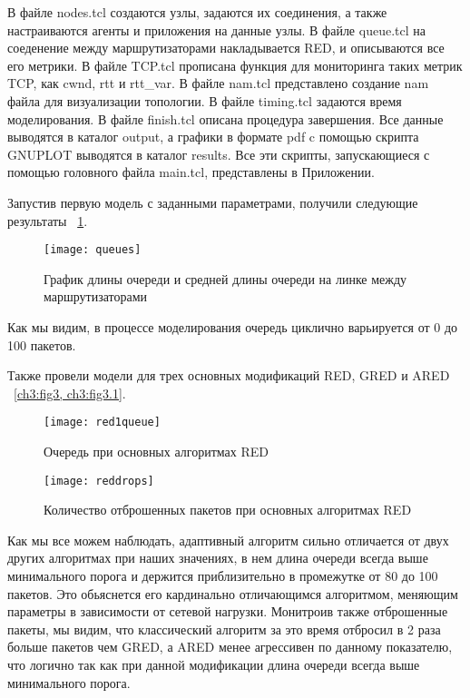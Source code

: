 В файле nodes.tcl создаются узлы, задаются их соединения, а также настраиваются агенты и приложения на данные узлы. 
В файле queue.tcl на соеденение между маршрутизаторами накладывается RED, и описываются все его метрики. В файле TCP.tcl 
прописана функция для мониторинга таких метрик TCP, как cwnd, rtt и rtt\_var. В файле nam.tcl представлено создание nam файла для 
визуализации топологии. В файле timing.tcl задаются время моделирования. В файле finish.tcl описана процедура завершения. 
Все данные выводятся в каталог output, а графики в формате pdf c помощью скрипта GNUPLOT выводятся в каталог results. 
Все эти скрипты, запускающиеся с помощью головного файла main.tcl, представлены в Приложении.

Запустив первую модель с заданными параметрами, получили следующие результаты ~\ref{ch3:fig2}.

\begin{figure}[h!]
 \centerline{\texttt{[image: queues]}}
 \caption{График длины очереди и средней длины очереди на линке между маршрутизаторами}
\label{ch3:fig2}
\end{figure}

Как мы видим, в процессе моделирования очередь циклично варьируется от 0 до 100 пакетов.

Также провели модели для трех основных модификаций RED, GRED и ARED ~\ref{ch3:fig3, ch3:fig3.1}.

\begin{figure}[h!]
  \centering
  \texttt{[image: red1queue]}
  \caption{Очередь при основных алгоритмах RED}
  \label{ch3:fig3}
 \end{figure}

 \begin{figure}[h!]
  \centering
  \texttt{[image: reddrops]}
  \caption{Количество отброшенных пакетов при основных алгоритмах RED}
  \label{ch3:fig3.1}
 \end{figure}
 
Как мы все можем наблюдать, адаптивный алгоритм сильно 
отличается от двух других алгоритмах при наших значениях, 
в нем длина очереди всегда выше минимального порога и 
держится приблизительно в промежутке от 80 до 100
пакетов. Это обьяснется его кардинально отличающимся 
алгоритмом, меняющим параметры в зависимости от сетевой нагрузки.
Монитроив также отброшенные пакеты, мы видим, что классический
алгоритм за это время отбросил в 2 раза больше пакетов чем
GRED, а ARED менее агрессивен по данному показателю, что логично
так как при данной модификации длина очереди всегда выше минимального
порога.


